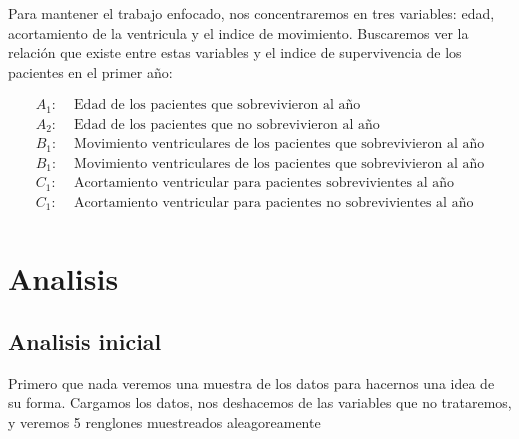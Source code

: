 \documentclass[11pt]{article}
\begin{document}
Para mantener el trabajo enfocado, nos concentraremos en tres variables:
edad, acortamiento de la ventricula y el indice de movimiento.
Buscaremos ver la relación que existe entre estas variables y el indice
de supervivencia de los pacientes en el primer año:

\[
\begin{split}
A_1\colon & \text{ Edad de los pacientes que sobrevivieron al año} \\
A_2\colon & \text{ Edad de los pacientes que no sobrevivieron al año} \\
B_1\colon & \text{ Movimiento ventriculares de los pacientes que sobrevivieron al año} \\
B_1\colon & \text{ Movimiento ventriculares de los pacientes que sobrevivieron al año} \\
C_1\colon & \text{ Acortamiento ventricular para pacientes sobrevivientes al año} \\
C_1\colon & \text{ Acortamiento ventricular para pacientes no sobrevivientes al año} \\
\end{split}
\]

    \hypertarget{analisis}{%
\section{Analisis}\label{analisis}}

\hypertarget{analisis-inicial}{%
\subsection{Analisis inicial}\label{analisis-inicial}}

Primero que nada veremos una muestra de los datos para hacernos una idea
de su forma. Cargamos los datos, nos deshacemos de las variables que no
trataremos, y veremos 5 renglones muestreados aleagoreamente
\end{document}
